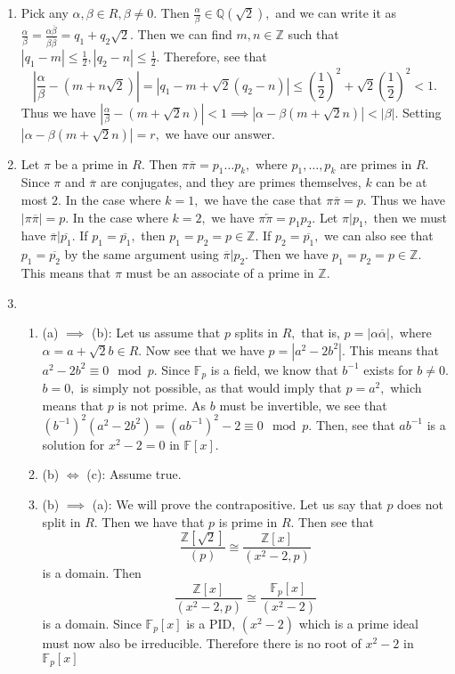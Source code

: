 \documentclass[]{article}
\begin{document}
\begin{enumerate}
	\item Pick any $\alpha,\beta \in R, \beta \neq 0.$ Then $\frac{\alpha}{\beta} \in \mathbb{Q}(\sqrt{2}),$ and we can write it as $ \frac{\alpha}{\beta}=\frac{\alpha \overline{\beta}}{\beta \overline{\beta}}=q_1+q_2\sqrt{2}.$ Then we can find $m ,n \in \mathbb{Z}$ such that $|q_1-m| \leq \frac{1}{2}, |q_2-n| \leq \frac{1}{2}.$ Therefore, see that 
	$$|\frac{\alpha}{\beta}-(m+n\sqrt{2})|= |q_1-m +\sqrt{2}(q_2-n)|\leq \left( \frac{1}{2} \right)^2 + \sqrt{2}\left( \frac{1}{2} \right)^2 < 1.$$ Thus we have $\left| \frac{\alpha}{\beta} - (m+\sqrt{2}n) \right|<1 \implies \left| \alpha - \beta (m+\sqrt{2}n) \right| < |\beta|. $ Setting $\left| \alpha - \beta (m+\sqrt{2}n) \right|=r,$ we have our answer.
	\item Let $\pi$ be a prime in $R.$ Then $\pi \overline{\pi}=p_1\dots p_k,$ where $p_1,\dots, p_k$ are primes in $R.$ Since $\pi$ and $\overline{\pi}$ are conjugates, and they are primes themselves, $k$ can be at most $2.$ In the case where $k=1,$ we have the case that $\pi \overline{\pi}=p.$ Thus we have $|\pi \overline{\pi}|=p.$ In the case where $k=2,$ we have $\pi \overleftarrow{\pi}=p_1p_2.$ Let $\pi | p_1, $ then we must have $ \overline{\pi} | \overline{p_1}$. If $p_1= \overline{p_1},$ then $p_1=p_2=p \in \mathbb{Z}.$ If $p_2= \overline{p_1},$ we can also see that $p_1=\overline{p_2}$ by the same argument using $\overline{\pi}|p_2.$ Then we have $p_1=p_2=p \in \mathbb{Z}.$ This means that $\pi$ must be an associate of a prime in $\mathbb{Z}.$
	
 	
	\item \begin{enumerate}
		\item (a) $\implies$ (b):  Let us assume that $p$ splits in $R,$ that is, $p=|\alpha \overline{\alpha}|,$ where $\alpha=a+\sqrt{2}b \in R.$ Now see that we have $p=|a^2-2b^2|.$ This means that $a^2-2b^2 \equiv 0 \mod p.$ Since $\mathbb{F}_p$ is a field, we know that $b^{-1}$ exists for $b \neq 0.$ $b=0,$ is simply not possible, as that would imply that $p=a^2,$ which means that $p$ is not prime. As $b$ must be invertible, we see that $(b^{-1})^2(a^2-2b^2)=(ab^{-1})^2-2 \equiv 0 \mod p.$ Then, see that $ab^{-1}$ is a solution for $x^2-2=0$ in $\mathbb{F}[x]$.
		
		\item (b) $\iff$ (c): Assume true.
		
		\item (b) $\implies$ (a):  We will prove the contrapositive. Let us say that $p$ does not split in $R$. Then we have that $p$ is prime in $R$. Then see that $$\frac{\mathbb{Z}[\sqrt{2}]}{(p)} \cong \frac{\mathbb{Z}[x]}{(x^2-2,p)} $$ is a domain. Then $$\frac{\mathbb{Z}[x]}{(x^2-2,p)} \cong \frac{\mathbb{F}_p[x]}{(x^2-2)} $$ is a domain. Since $\mathbb{F}_p[x]$ is a PID, $(x^2-2)$ which is a prime ideal must now also be irreducible. Therefore there is no root of $x^2-2$ in $\mathbb{F}_p[x]$	
	

\end{enumerate}
\end{enumerate}
\end{document}
